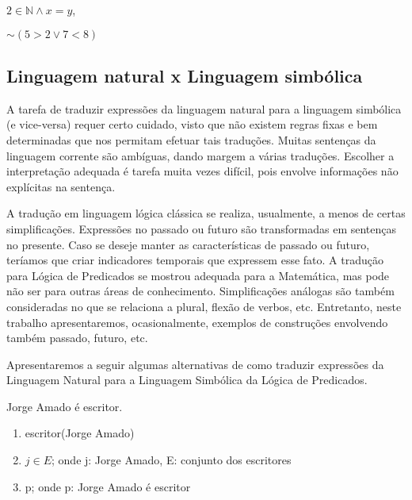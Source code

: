 \hskip 2.5cm $2 \in \mathbb{N} \wedge x = y$,

\hskip 2.5cm $\sim(5 > 2 \vee 7 < 8)$

\newpage

    \subsection*{Linguagem natural x Linguagem simbólica}

A tarefa de traduzir expressões da linguagem natural para a linguagem simbólica (e vice-versa) requer certo cuidado, visto que não existem regras fixas e bem determinadas que nos permitam efetuar tais traduções.
Muitas sentenças da linguagem corrente são ambíguas, dando margem a várias traduções.
Escolher a interpretação adequada é tarefa muita vezes difícil, pois envolve informações não explícitas na sentença.

A tradução em linguagem lógica clássica se realiza, usualmente, a menos de certas simplificações.
Expressões no passado ou futuro são transformadas em sentenças no presente.
Caso se deseje manter as características de passado ou futuro, teríamos que criar indicadores temporais que expressem esse fato.
A tradução para Lógica de Predicados se mostrou adequada para a Matemática, mas pode não ser para outras áreas de conhecimento.
Simplificações análogas são também consideradas no que se relaciona a plural, flexão de verbos, etc.
Entretanto, neste trabalho apresentaremos, ocasionalmente, exemplos de construções envolvendo também passado, futuro, etc.

\newpage

Apresentaremos a seguir algumas alternativas de como traduzir expressões da Linguagem Natural para a Linguagem Simbólica da Lógica de Predicados.

\setcounter{exemplo}{0} %

\bigskip
\begin{exemplo} Jorge Amado é escritor.
\end{exemplo}

\begin{enumerate}[label=(\roman*)]
    \item escritor(Jorge Amado)
    \item $j \in E$; onde j: Jorge Amado, E: conjunto dos escritores
    \item p; onde p: Jorge Amado é escritor
\end{enumerate}

